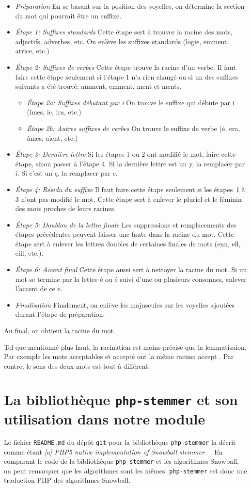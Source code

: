 \newcommand{\ETAPE}[1]{\item{\emph{#1}}}

\begin{itemize}
\ETAPE{Pr\'eparation}
En se basant sur la position des voyelles, on d\'etermine la section du mot qui pourrait \^etre un suffixe.
\ETAPE{\'Etape 1: Suffixes standards}
Cette \'etape sert \`a trouver la racine des mots, adjectifs, adverbes, etc.
On enl\`eve les suffixes standards (logie, emment, atrice, etc.)
\ETAPE{\'Etape 2: Suffixes de verbes}
Cette \'etape trouve la racine d'un verbe.
Il faut faire cette \'etape seulement si l'\'etape 1 n'a rien chang\'e ou si un des suffixes suivants a \'et\'e trouv\'e: amment, emment, ment et ments.
\begin{itemize}
\ETAPE{\'Etape 2a: Suffixes d\'ebutant par i}
On trouve le suffixe qui d\'ebute par i (\^imes, ie, ira, etc.)
\ETAPE{\'Etape 2b: Autres suffixes de verbes}
On trouve le suffixe de verbe (\'e, era, \^ames, aient, etc.)
\end{itemize}
\ETAPE{\'Etape 3: Derni\`ere lettre}
Si les \'etapes 1 ou 2 ont modifi\'e le mot, faire cette \'etape, sinon passer \`a l'\'etape 4.
Si la derni\`ere lettre est un y, la remplacer par i.
Si c'est un \c{c}, la remplacer par c.
\ETAPE{\'Etape 4: R\'esidu du suffixe}
Il faut faire cette \'etape seulement si les \'etapes~1 \`a 3 n'ont pas modifi\'e le mot.
Cette \'etape sert \`a enlever le pluriel et le f\'eminin des mots proches de leurs racines.
\ETAPE{\'Etape 5: Doublon de la lettre finale}
Les suppressions et remplacements des \'etapes pr\'ec\'edentes peuvent laisser une faute dans la racine du mot.
Cette \'etape sert \`a enlever les lettres doubles de certaines finales de mots (enn, ell, eill, etc.).
\ETAPE{\'Etape 6: Accent final}
Cette \'etape aussi sert \`a nettoyer la racine du mot.
Si un mot se termine par la lettre {\`e ou \'e} suivi d'une ou plusieurs consonnes, enlever l'accent de ce {e}.
\ETAPE{Finalisation}
Finalement, on enl\`eve les majuscules sur les voyelles ajout\'ees durant l'\'etape de pr\'eparation.
\end{itemize}
Au final, on obtient la racine du mot.

Tel que mentionn\'e plus haut, la racination est moins pr\'ecise que la lemmatisaion.
Par exemple les mots \og acceptables \fg{} et \og accept\'e \fg{} ont la m\^eme racine: \og accept \fg{}.
Par contre, le sens des deux mots est tout \`a diff\'erent.


\section{La biblioth\`eque \texttt{php-stemmer} et son utilisation dans notre module}
\label{chap:phpstemmer}
Le fichier \texttt{README.md} du d\'ep\^ot \texttt{git} pour la biblioth\`eque \texttt{php-stemmer} la d\'ecrit comme \'etant \og \textit{[a] PHP5 native implementation of Snowball stemmer} \fg{}~\cite{phpstemmer}.
%
En comparant le code de la biblioth\`eque \texttt{php-stemmer} et les algorithmes Snowball, on peut remarquer que les algorithmes sont les m\^emes.
\texttt{php-stemmer} est donc une traduction PHP des algorithmes Snowball.


